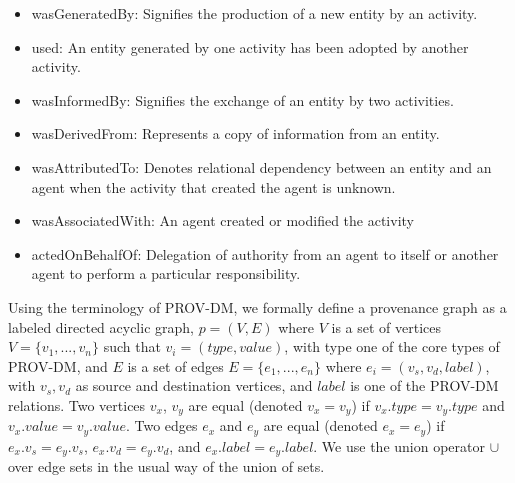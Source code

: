 \begin{itemize}
\item wasGeneratedBy: Signifies the production of a new entity by an activity. 

\item used: An entity generated by one activity has been adopted by another activity.

\item wasInformedBy: Signifies the exchange of an entity by two activities.

\item wasDerivedFrom: Represents a copy of information from an entity. 

\item wasAttributedTo: Denotes relational dependency between an entity and an agent when the activity that created the agent is unknown.

\item wasAssociatedWith: An agent created or modified the activity

\item actedOnBehalfOf: Delegation of authority from an agent to itself or another agent to perform a particular responsibility. 



\end{itemize}


Using the terminology of PROV-DM, we formally define a provenance graph as a labeled directed acyclic graph, $p = (V,E)$ where $V$ is a set of vertices $V =\{v_1,...,v_n\}$ such that $v_i = (type, value)$, with type one of the core types of PROV-DM, and $E$ is a set of edges $E =\{e_1,..., e_n\}$ where $e_i = (v_s, v_d, label)$, with $v_s, v_d$ as source and destination vertices, and $label$ is one of the PROV-DM relations. Two vertices $v_x$, $v_y$ are equal (denoted $ v_x = v_y$) if $v_x.type = v_y.type$ and $v_x.value = v_y.value$. Two edges $e_x $ and $e_y$ are equal (denoted $e_x = e_y$) if $e_x.v_s = e_y.v_s$, $e_x.v_d = e_y.v_d$, and $e_x.label = e_y.label$.  We use the union operator $\cup$ over edge sets in the usual way of the union of sets.




